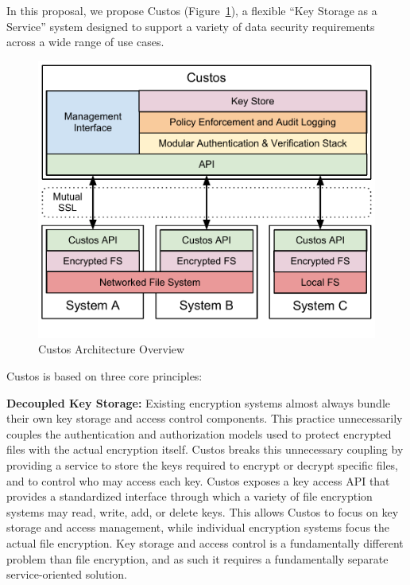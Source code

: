 In this proposal, we propose Custos (Figure~\ref{fig:custosoverview}), 
a flexible ``Key Storage as
a Service'' system designed to support a variety of data security
requirements across a wide range of use cases. 

\begin{figure}[!tb]
  \centering
  \includegraphics[width=\columnwidth]{./include/CustosOverview.pdf}
  \caption{Custos Architecture Overview}
  \label{fig:custosoverview}
\end{figure}

Custos is based on three core principles:

\noindent
\textbf{Decoupled Key Storage:}
Existing encryption systems almost always bundle their own key storage
and access control components. This practice unnecessarily couples the
authentication and authorization models used to protect encrypted
files with the actual encryption itself. 
Custos breaks this unnecessary coupling by providing a service to store the keys
required to encrypt or decrypt specific files, and to control who may
access each key. Custos exposes a key access API that provides a
standardized interface through which a variety of file encryption
systems may read, write, add, or delete keys. This allows Custos to
focus on key storage and access management, while individual
encryption systems focus the actual file encryption. Key storage and
access control is a fundamentally different problem than file
encryption, and as such it requires a fundamentally separate
service-oriented solution.


